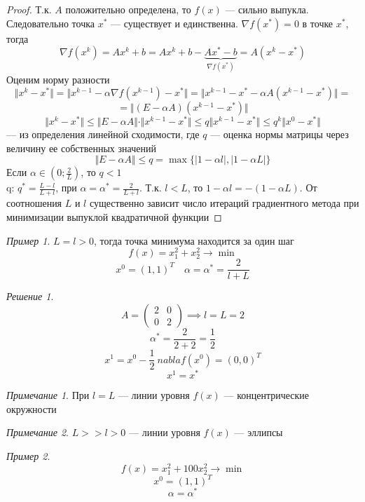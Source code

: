 \documentclass[english]{article}
\theoremstyle{plain}
\theoremstyle{remark}
\newtheorem*{remark}{Примечание}
\newtheorem*{solution}{Решение}
\newtheorem*{examp}{Пример}
\theoremstyle{definition}
\begin{document}
\begin{proof}
Т.к. \(A\) положительно определена, то \(f(x)\) --- сильно выпукла. Следовательно точка \(x^*\) --- существует и единственна. \(\nabla f(x^*) = 0\) в точке \(x^*\), тогда
\[ \nabla f(x^k) = A x^k + b = A x^k + b - \underbrace{A x^* - b}_{\nabla f(x^*)} = A(x^k - x^*) \]
Оценим норму разности
\[ \Vert x^k - x^* \Vert = \Vert x^{k - 1} - \alpha \nabla f(x^{k - 1}) - x^* \Vert = \Vert x^{k - 1} - x^* - \alpha A(x^{k - 1} - x^*) \Vert = \]
\[ = \Vert (E - \alpha A) (x^{k - 1} - x^*)  \Vert \]
\[ \Vert x^k - x^* \Vert \le \Vert E - \alpha A \Vert \cdot \Vert x^{k - 1} - x^* \Vert \le q \Vert x^{k - 1} - x^* \Vert \le q^k \Vert x^0 - x^* \Vert \]
--- из определения линейной сходимости, где \(q\) --- оценка нормы матрицы через величину ее собственных значений
\[ \Vert E - \alpha A \Vert \le q = \max \{|1 - \alpha l|, |1 - \alpha L|\} \]
Если \(\alpha \in (0; \frac{2}{L})\), то \(q < 1\) \\
q: \(q^* = \frac{L - l}{L + l}\), при \(\alpha = \alpha^* = \frac{2}{L + l}\). Т.к. \(l < L\), то \(1 - \alpha l = - (1 - \alpha L)\). От соотношения \(L\) и \(l\) существенно зависит число итераций градиентного метода при минимизации выпуклой квадратичной функции
\end{proof}
\begin{examp}
\(L = l > 0\), тогда точка минимума находится за один шаг
\[ f(x) = x_1^2 + x_2^2 \to \min \]
\[ x^0 = (1, 1)^T \quad \alpha = \alpha^* = \frac{2}{l + L}\]
\end{examp}
\begin{solution}
\[ A = \begin{pmatrix} 2 & 0 \\ 0 & 2 \end{pmatrix} \implies l = L = 2 \]
\[ \alpha^* = \frac{2}{2 + 2} = \frac{1}{2} \]
\[ x^1 = x^0 - \frac{1}{2}\ nabla f(x^0) = (0, 0)^T \]
\[ x^1 = x^* \]
\end{solution}
\begin{remark}
При \(l = L\) --- линии уровня \(f(x)\) --- концентрические окружности
\end{remark}
\begin{remark}
\(L >> l > 0\) --- линии уровня \(f(x)\) --- эллипсы
\end{remark}
\begin{examp}
\[ f(x) = x_1^2 + 100x^2_2 \to \min \]
\[ x^0 = (1, 1)^T \]
\[ \alpha = \alpha^* \]
\end{examp}
\end{document}
